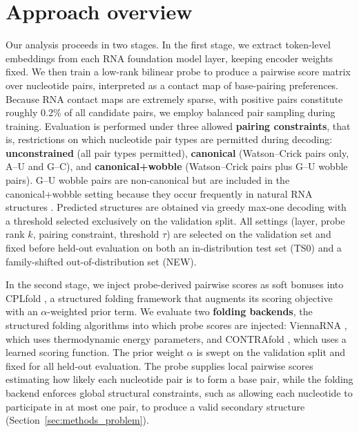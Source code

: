 \documentclass[logo,bsc,singlespacing,parskip]{infthesis}
\begin{document}
\section{Approach overview}
\label{sec:intro_overview}
Our analysis proceeds in two stages.
In the first stage, we extract token-level embeddings from each RNA foundation model layer, keeping encoder weights fixed. We then train a low-rank bilinear probe \citep{hewitt2019structural} to produce a pairwise score matrix over nucleotide pairs, interpreted as a contact map of base-pairing preferences. Because RNA contact maps are extremely sparse, with positive pairs constitute roughly 0.2\% of all candidate pairs, we employ balanced pair sampling during training. Evaluation is performed under three allowed \textbf{pairing constraints}, that is, restrictions on which nucleotide pair types are permitted during decoding: 
\textbf{unconstrained} (all pair types permitted),
\textbf{canonical} (Watson--Crick pairs only, A--U and G--C),
and \textbf{canonical+wobble} (Watson--Crick pairs plus G--U
wobble pairs). G--U wobble pairs are non-canonical but are included in the canonical+wobble setting because they occur frequently in natural RNA structures \citep{varani2000gu}.
Predicted structures are obtained via greedy max-one decoding with a threshold selected exclusively on the validation split. All settings (layer, probe rank $k$, pairing constraint, threshold $\tau$) are selected on the validation set and fixed before held-out evaluation on both an in-distribution test set (TS0) and a family-shifted out-of-distribution set (NEW).

In the second stage, we inject probe-derived pairwise scores as soft bonuses into CPLfold \citep{wang2026cplfold}, a structured folding framework that augments its scoring objective with an $\alpha$-weighted prior term. We evaluate two \textbf{folding backends}, the structured folding algorithms into which probe scores are injected: ViennaRNA \citep{lorenz2011viennarna}, which uses thermodynamic energy parameters, and CONTRAfold \citep{do2006contrafold}, which uses a learned scoring function. The prior weight $\alpha$ is swept on the validation split and fixed for all held-out evaluation. The probe supplies local pairwise scores estimating how likely each nucleotide pair is to form a base pair, while the folding backend enforces global structural constraints, such as allowing each nucleotide to participate in at most one pair, to produce a valid secondary structure (Section~\ref{sec:methods_problem}).
\end{document}
